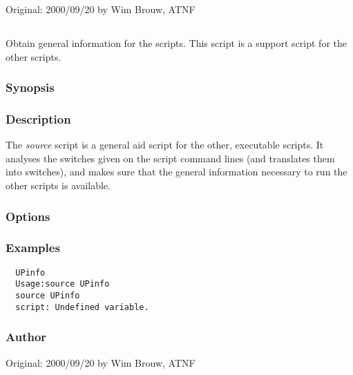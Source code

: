 Original: 2000/09/20 by Wim Brouw, ATNF


\newpage

\subsection{}
\label{UPinfo}

Obtain general information for the  scripts. This script is a support
script for the other  scripts.


\subsubsection*{Synopsis}

\begin{synopsis}
\end{synopsis}

\subsubsection*{Description}

\noindent
The  {\em source} script is a general aid script for the other,
executable  scripts. It analyses the switches given on the script
command lines (and translates them into switches), and makes sure that the
general information necessary to run the other scripts is available.

\subsubsection*{Options}

\subsubsection*{Examples}

\begin{verbatim}
  UPinfo
  Usage:source UPinfo
  source UPinfo
  script: Undefined variable.
\end{verbatim}

\subsubsection*{Author}

Original: 2000/09/20 by Wim Brouw, ATNF

